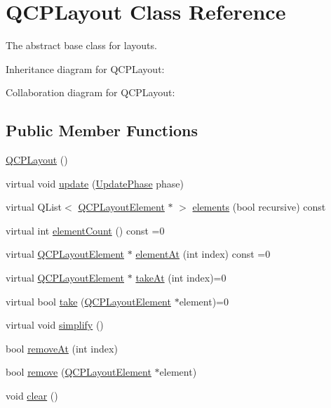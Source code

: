 \hypertarget{classQCPLayout}{}\section{Q\+C\+P\+Layout Class Reference}
\label{classQCPLayout}


The abstract base class for layouts.  




Inheritance diagram for Q\+C\+P\+Layout\+:


Collaboration diagram for Q\+C\+P\+Layout\+:
\subsection*{Public Member Functions}
\begin{DoxyCompactItemize}
\item 
\hyperlink{classQCPLayout_a04222e6e1361fd802d48f1a25b7020d4}{Q\+C\+P\+Layout} ()
\item 
virtual void \hyperlink{classQCPLayout_a34ab477e820537ded7bade4399c482fd}{update} (\hyperlink{classQCPLayoutElement_a0d83360e05735735aaf6d7983c56374d}{Update\+Phase} phase)
\item 
virtual Q\+List$<$ \hyperlink{classQCPLayoutElement}{Q\+C\+P\+Layout\+Element} $\ast$ $>$ \hyperlink{classQCPLayout_a51fe2675b53e829130b229bc1f7b0f99}{elements} (bool recursive) const 
\item 
virtual int \hyperlink{classQCPLayout_a39d3e9ef5d9b82ab1885ba1cb9597e56}{element\+Count} () const =0
\item 
virtual \hyperlink{classQCPLayoutElement}{Q\+C\+P\+Layout\+Element} $\ast$ \hyperlink{classQCPLayout_afa73ca7d859f8a3ee5c73c9b353d2a56}{element\+At} (int index) const =0
\item 
virtual \hyperlink{classQCPLayoutElement}{Q\+C\+P\+Layout\+Element} $\ast$ \hyperlink{classQCPLayout_a5a79621fa0a6eabb8b520cfc04fb601a}{take\+At} (int index)=0
\item 
virtual bool \hyperlink{classQCPLayout_ada26cd17e56472b0b4d7fbbc96873e4c}{take} (\hyperlink{classQCPLayoutElement}{Q\+C\+P\+Layout\+Element} $\ast$element)=0
\item 
virtual void \hyperlink{classQCPLayout_a41e6ac049143866e8f8b4964efab01b2}{simplify} ()
\item 
bool \hyperlink{classQCPLayout_a2403f684fee3ce47132faaeed00bb066}{remove\+At} (int index)
\item 
bool \hyperlink{classQCPLayout_a6c58f537d8086f352576ab7c5b15d0bc}{remove} (\hyperlink{classQCPLayoutElement}{Q\+C\+P\+Layout\+Element} $\ast$element)
\item 
void \hyperlink{classQCPLayout_a02883bdf2769b5b227f0232dba1ac4ee}{clear} ()
\end{DoxyCompactItemize}
